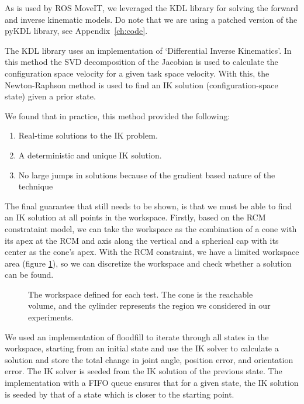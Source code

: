 \documentclass[BTech]{iitmdiss}
\begin{document}
    As is used by ROS MoveIT, we leveraged the KDL library for solving the forward and inverse kinematic models.
    Do note that we are using a patched version of the pyKDL library, see Appendix~\ref{ch:code}.

    The KDL library uses an implementation of `Differential Inverse Kinematics'.
    In this method the SVD decomposition of the Jacobian is used to calculate the configuration space velocity for a given task space velocity.
    With this, the Newton-Raphson method is used to find an IK solution (configuration-space state) given a prior state.

    We found that in practice, this method provided the following:
    \begin{enumerate}
        \item Real-time solutions to the IK problem.
        \item A deterministic and unique IK solution.
        \item No large jumps in solutions because of the gradient based nature of the technique
    \end{enumerate}

    The final guarantee that still needs to be shown, is that we must be able to find an IK solution at all points in the workspace.
    Firstly, based on the RCM constrataint model, we can take the workspace as the combination of a cone with its apex at the RCM
    and axis along the vertical and a spherical cap with its center as the cone's apex.
    With the RCM constraint, we have a limited workspace area (figure \ref{fig:workspaces}), so we can discretize the workspace and check whether a
    solution can be found.

    \begin{figure}
        \centering
        \qquad
        \qquad
        \caption{The workspace defined for each test. The cone is the reachable volume, and the cylinder represents the region we considered in our experiments.}
        \label{fig:workspaces}
    \end{figure}
    We used an implementation of floodfill to iterate through all states in the workspace, starting from an initial state
    and use the IK solver to calculate a solution and store the total change in joint angle, position error, and orientation error.
    The IK solver is seeded from the IK solution of the previous state.
    The implementation with a FIFO queue ensures that for a given state, the IK solution is seeded by that of a state which is closer to the starting point.
\end{document}
